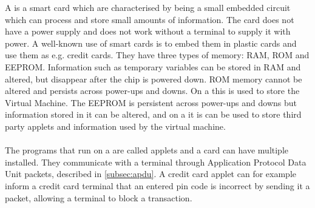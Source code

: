 A \jc is a smart card which are characterised by being a small embedded circuit which can process and store small amounts of information. The card does not have a power supply and does not work without a terminal to supply it with power. A well-known use of smart cards is to embed them in plastic cards and use them as e.g. credit cards. They have three types of memory: RAM, ROM and EEPROM. Information such as temporary variables can be stored in RAM and altered, but disappear after the chip is powered down. ROM memory cannot be altered and persists across power-ups and downs. On a \jc this is used to store the \jc Virtual Machine. The EEPROM is persistent across power-ups and downs but information stored in it can be altered, and on a \jc it is can be used to store third party applets and information used by the virtual machine.\\\\
The programs that run on a \jc are called applets and a card can have multiple installed. They communicate with a terminal through Application Protocol Data Unit packets, described in \cref{subsec:apdu}. A credit card applet can for example inform a credit card terminal that an entered pin code is incorrect by sending it a packet, allowing a terminal to block a transaction.